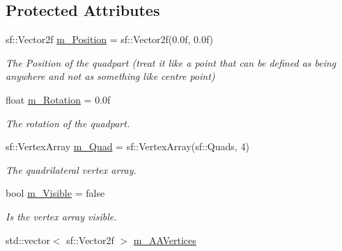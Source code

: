 \subsection*{Protected Attributes}
\begin{DoxyCompactItemize}
\item 
\mbox{\label{class_quad_part_a7d255fb66984146f4053216fb2d1b232}} 
sf\+::\+Vector2f \hyperlink{class_quad_part_a7d255fb66984146f4053216fb2d1b232}{m\+\_\+\+Position} = sf\+::\+Vector2f(0.\+0f, 0.\+0f)
\begin{DoxyCompactList}\small\item\em The Position of the quadpart (treat it like a point that can be defined as being anywhere and not as something like centre point) \end{DoxyCompactList}\item 
\mbox{\label{class_quad_part_a22ba5ba93e3a4a42715f077a6a4d3fe5}} 
float \hyperlink{class_quad_part_a22ba5ba93e3a4a42715f077a6a4d3fe5}{m\+\_\+\+Rotation} = 0.\+0f
\begin{DoxyCompactList}\small\item\em The rotation of the quadpart. \end{DoxyCompactList}\item 
\mbox{\label{class_quad_part_aba000e724202a95e712e134486d2bfad}} 
sf\+::\+Vertex\+Array \hyperlink{class_quad_part_aba000e724202a95e712e134486d2bfad}{m\+\_\+\+Quad} = sf\+::\+Vertex\+Array(sf\+::\+Quads, 4)
\begin{DoxyCompactList}\small\item\em The quadrilateral vertex array. \end{DoxyCompactList}\item 
\mbox{\label{class_quad_part_afa3122aba86cf6789e3227cb17eead8e}} 
bool \hyperlink{class_quad_part_afa3122aba86cf6789e3227cb17eead8e}{m\+\_\+\+Visible} = false
\begin{DoxyCompactList}\small\item\em Is the vertex array visible. \end{DoxyCompactList}\item 
\mbox{\label{class_quad_part_a0a10eb1fd79685ce1e45da9cc135eeea}} 
std\+::vector$<$ sf\+::\+Vector2f $>$ \hyperlink{class_quad_part_a0a10eb1fd79685ce1e45da9cc135eeea}{m\+\_\+\+A\+A\+Vertices}

\end{DoxyCompactItemize}
